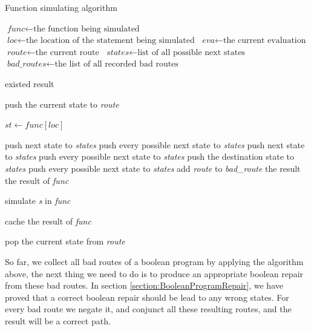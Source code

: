 \documentclass[10pt,journal,final,]{article}
\theoremstyle{definition}
\begin{document}
\begin{algorithm}
\caption{Function simulating algorithm}
\begin{algorithmic}[1]

\STATE $\textit{func} \gets \text{the function being simulated}$
\STATE $\textit{loc} \gets \text{the location of the statement being simulated}$
\STATE $\textit{eva} \gets \text{the current evaluation}$
\STATE $\textit{route} \gets \text{the current route}$
\STATE $\textit{states} \gets \text{list of all possible next states}$
\STATE $\textit{bad\_routes} \gets \text{the list of all recorded bad routes}$
\STATE

    \RETURN existed result
  \ENDIF
\ENDIF

\STATE
\STATE push the current state to \textit{route}

\STATE
\STATE $\textit{st} \gets \textit{func}[\textit{loc}]$

    \STATE push next state to \textit{states}
  \ELSE
    \STATE push every possible next state to \textit{states}
  \ENDIF
{}
    \STATE push next state to \textit{states}
  \ELSE
    \STATE push every possible next state to \textit{states}
  \ENDIF
{}
  \STATE push the destination state to \textit{states}
  \STATE push every possible next state to \textit{states}
      \STATE add \textit{route} to \textit{bad\_route}
      \RETURN the result
    \ENDIF
  \ENDIF
\ELSE
    \RETURN the result of \textit{func}
  \ENDIF
\ENDIF

\STATE
{}
  \STATE simulate \textit{s} in \textit{func}
\ENDFOR

\STATE
{}
  \STATE cache the result of \textit{func}
\ENDIF

\STATE
\STATE pop the current state from \textit{route}
\end{algorithmic}
\end{algorithm}

So far, we collect all bad routes of a boolean program by applying the algorithm above, the next thing we need to do is to produce an appropriate boolean repair from these bad routes.
In section \ref{section:BooleanProgramRepair}, we have proved that a correct boolean repair should be lead to any wrong states.
For every bad route we negate it, and conjunct all these resulting routes, and the result will be a correct path.
\end{document}
